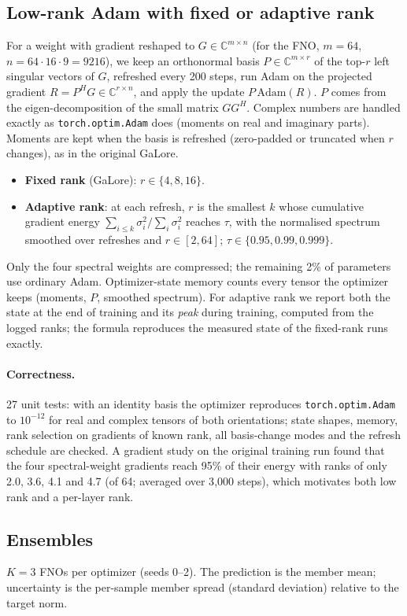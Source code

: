 \documentclass[11pt,a4paper]{article}
\begin{document}
\subsection{Low-rank Adam with fixed or adaptive rank}
For a weight with gradient reshaped to $G\in\mathbb{C}^{m\times n}$ (for the FNO, $m=64$, $n=64\cdot16\cdot9=9216$),
we keep an orthonormal basis $P\in\mathbb{C}^{m\times r}$ of the top-$r$ left singular vectors of $G$, refreshed
every 200 steps, run Adam on the projected gradient $R=P^{H}G\in\mathbb{C}^{r\times n}$, and apply the update
$P\,\mathrm{Adam}(R)$. $P$ comes from the eigen-decomposition of the small matrix $GG^{H}$. Complex numbers are
handled exactly as \texttt{torch.optim.Adam} does (moments on real and imaginary parts). Moments are kept when the
basis is refreshed (zero-padded or truncated when $r$ changes), as in the original GaLore.
\begin{itemize}\itemsep1pt
\item \textbf{Fixed rank} (GaLore): $r\in\{4,8,16\}$.
\item \textbf{Adaptive rank}: at each refresh, $r$ is the smallest $k$ whose cumulative gradient energy
$\sum_{i\le k}\sigma_i^2/\sum_i\sigma_i^2$ reaches $\tau$, with the normalised spectrum smoothed over refreshes
and $r\in[2,64]$; $\tau\in\{0.95,0.99,0.999\}$.
\end{itemize}
Only the four spectral weights are compressed; the remaining 2\% of parameters use ordinary Adam.
Optimizer-state memory counts every tensor the optimizer keeps (moments, $P$, smoothed spectrum).
For adaptive rank we report both the state at the end of training and its \emph{peak} during training, computed
from the logged ranks; the formula reproduces the measured state of the fixed-rank runs exactly.

\paragraph{Correctness.} 27 unit tests: with an identity basis the optimizer reproduces \texttt{torch.optim.Adam}
to $10^{-12}$ for real and complex tensors of both orientations; state shapes, memory, rank selection on
gradients of known rank, all basis-change modes and the refresh schedule are checked. A gradient study on the
original training run found that the four spectral-weight gradients reach 95\% of their energy with ranks of only
2.0, 3.6, 4.1 and 4.7 (of 64; averaged over 3{,}000 steps), which motivates both low rank and a per-layer rank.

\subsection{Ensembles}
$K=3$ FNOs per optimizer (seeds 0--2). The prediction is the member mean; uncertainty is the per-sample member
spread (standard deviation) relative to the target norm.
\end{document}
